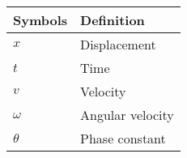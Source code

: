 \begin{table}[h]
\begin{tabular}{|l|l|}
\hline
\textbf{Symbols} & \textbf{Definition}\\ \hline
$x$ & Displacement \\ \hline
$t$ & Time \\ \hline
$v$ & Velocity\\ \hline
$\omega$ & Angular velocity   \\ \hline
$\theta$ & Phase constant\\ \hline
\end{tabular}
\end{table}
